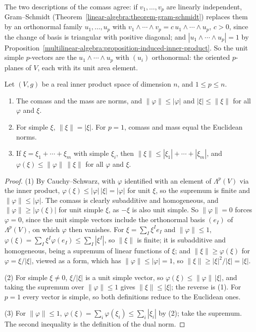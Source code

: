 The two descriptions of the comass agree: if $v_1, \ldots, v_p$ are linearly independent, Gram--Schmidt (Theorem~\ref{linear-algebra:theorem-gram-schmidt}) replaces them by an orthonormal family
$u_1, \ldots, u_p$ with $v_1 \wedge \cdots \wedge v_p = c\,u_1 \wedge \cdots \wedge u_p$, $c > 0$, since the change of basis is triangular with positive diagonal; and $|u_1 \wedge \cdots \wedge u_p| = 1$ by
Proposition~\ref{multilinear-algebra:proposition-induced-inner-product}. So the unit simple $p$-vectors are the $u_1 \wedge \cdots \wedge u_p$ with $(u_i)$ orthonormal: the oriented $p$-planes of $V$, each with its
unit area element.

\begin{proposition}\label{multilinear-algebra:proposition-comass}
Let $(V, g)$ be a real inner product space of dimension $n$, and $1 \leq p \leq n$.
\begin{enumerate}
\item The comass and the mass are norms, and $\|\varphi\| \leq |\varphi|$ and $|\xi| \leq \|\xi\|$ for all $\varphi$ and $\xi$.
\item For simple $\xi$, $\|\xi\| = |\xi|$. For $p = 1$, comass and mass equal the Euclidean norms.
\item If $\xi = \xi_1 + \cdots + \xi_m$ with simple $\xi_i$, then $\|\xi\| \leq |\xi_1| + \cdots + |\xi_m|$, and $\varphi(\xi) \leq \|\varphi\|\,\|\xi\|$ for all $\varphi$ and $\xi$.
\end{enumerate}
\end{proposition}

\begin{proof}
(1) By Cauchy--Schwarz, with $\varphi$ identified with an element of $\Lambda^p(V)$ via the inner product, $\varphi(\xi) \leq |\varphi|\,|\xi| = |\varphi|$ for unit $\xi$, so the supremum is finite and $\|\varphi\| \leq |\varphi|$.
The comass is clearly subadditive and homogeneous, and $\|\varphi\| \geq |\varphi(\xi)|$ for unit simple $\xi$, as $-\xi$ is also unit simple. So $\|\varphi\| = 0$ forces $\varphi = 0$, since the unit simple vectors include the orthonormal basis $(e_I)$ of
$\Lambda^p(V)$, on which $\varphi$ then vanishes. For $\xi = \sum_I\xi^Ie_I$ and $\|\varphi\| \leq 1$, $\varphi(\xi) = \sum_I\xi^I\varphi(e_I) \leq \sum_I|\xi^I|$, so $\|\xi\|$ is finite;
it is subadditive and homogeneous, being a supremum of linear functions of $\xi$; and $\|\xi\| \geq \varphi(\xi)$ for $\varphi = \xi/|\xi|$, viewed as a form, which has $\|\varphi\| \leq |\varphi| = 1$, so $\|\xi\| \geq |\xi|^2/|\xi| = |\xi|$.

(2) For simple $\xi \neq 0$, $\xi/|\xi|$ is a unit simple vector, so $\varphi(\xi) \leq \|\varphi\|\,|\xi|$, and taking the supremum over $\|\varphi\| \leq 1$ gives $\|\xi\| \leq |\xi|$; the reverse is (1). For $p = 1$ every
vector is simple, so both definitions reduce to the Euclidean ones.

(3) For $\|\varphi\| \leq 1$, $\varphi(\xi) = \sum_i\varphi(\xi_i) \leq \sum_i|\xi_i|$ by (2); take the supremum. The second inequality is the definition of the dual norm.
\end{proof}

